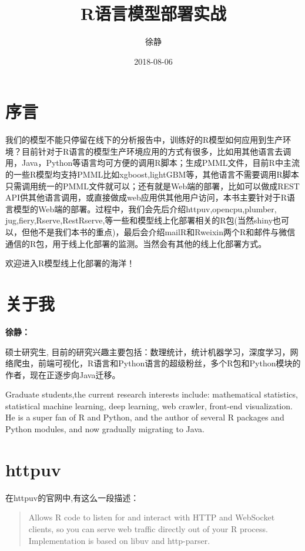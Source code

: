 \documentclass[]{book}
\title{R语言模型部署实战}
\author{徐静}
\date{2018-08-06}
\theoremstyle{definition}
\theoremstyle{definition}
\theoremstyle{definition}
\theoremstyle{remark}
\begin{document}
\maketitle

{
\setcounter{tocdepth}{1}
\tableofcontents
}
\chapter*{序言}

我们的模型不能只停留在线下的分析报告中，训练好的R模型如何应用到生产环境？目前针对于R语言的模型生产环境应用的方式有很多，比如用其他语言去调用，Java，Python等语言均可方便的调用R脚本；生成PMML文件，目前R中主流的一些R模型均支持PMML比如xgboost,lightGBM等，其他语言不需要调用R脚本只需调用统一的PMML文件就可以；还有就是Web端的部署，比如可以做成REST
API供其他语言调用，或直接做成web应用供其他用户访问，本书主要针对于R语言模型的Web端的部署。过程中，我们会先后介绍httpuv,opencpu,plumber,
jug,fiery,Rserve,RestRserve,等一些和模型线上化部署相关的R包(当然shiny也可以，但他不是我们本书的重点)，最后会介绍mailR和Rweixin两个R和邮件与微信通信的R包，用于线上化部署的监测。当然会有其他的线上化部署方式。

欢迎进入R模型线上化部署的海洋！

\chapter*{关于我}

\textbf{徐静：}

硕士研究生,
目前的研究兴趣主要包括：数理统计，统计机器学习，深度学习，网络爬虫，前端可视化，R语言和Python语言的超级粉丝，多个R包和Python模块的作者，现在正逐步向Java迁移。

Graduate students,the current research interests include: mathematical
statistics, statistical machine learning, deep learning, web crawler,
front-end visualization. He is a super fan of R and Python, and the
author of several R packages and Python modules, and now gradually
migrating to Java.

\chapter{httpuv}\label{httpuv}

在httpuv的官网中,有这么一段描述：

\begin{quote}
Allows R code to listen for and interact with HTTP and WebSocket
clients, so you can serve web traffic directly out of your R process.
Implementation is based on libuv and http-parser.
\end{quote}
\end{document}
